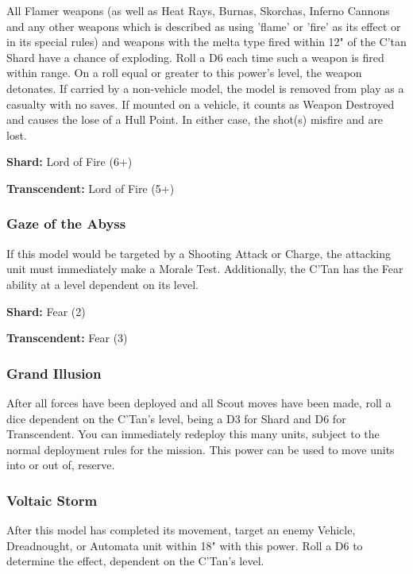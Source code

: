 All Flamer weapons (as well as Heat Rays, Burnas, Skorchas, Inferno Cannons and any other weapons which is described as using 'flame' or 'fire' as its effect or in its special rules) and weapons with the melta type fired within 12" of the C'tan Shard have a chance of exploding. Roll a D6 each time such a weapon is fired within range. On a roll equal or greater to this power's level, the weapon detonates. If carried by a non-vehicle model, the model is removed from play as a casualty with no saves. If mounted on a vehicle, it counts as Weapon Destroyed and causes the lose of a Hull Point. In either case, the shot(s) misfire and are lost.

\textbf{Shard:} Lord of Fire (6+)

\textbf{Transcendent:} Lord of Fire (5+)


\subsubsection{Gaze of the Abyss} \label{Gaze of the Abyss}

If this model would be targeted by a Shooting Attack or Charge, the attacking unit must immediately make a Morale Test. Additionally, the C'Tan has the Fear ability at a level dependent on its level.

\textbf{Shard:} Fear (2)

\textbf{Transcendent:} Fear (3)


\subsubsection{Grand Illusion} \label{Grand Illusion}

After all forces have been deployed and all Scout moves have been made, roll a dice dependent on the C'Tan's level, being a D3 for Shard and D6 for Transcendent. You can immediately redeploy this many units, subject to the normal deployment rules for the mission. This power can be used to move units into or out of, reserve.


\subsubsection{Voltaic Storm} \label{Voltaic Storm}

After this model has completed its movement, target an enemy Vehicle, Dreadnought, or Automata unit within 18" with this power. Roll a D6 to determine the effect, dependent on the C'Tan's level.

